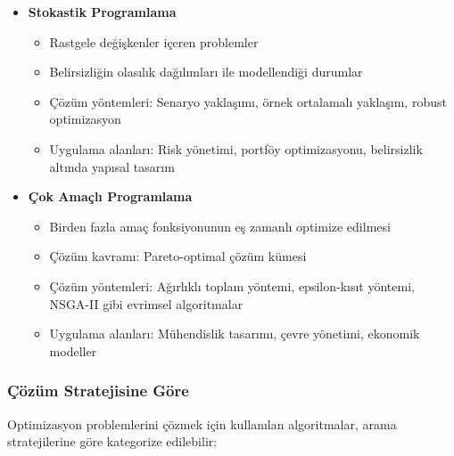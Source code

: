\begin{itemize}
    \item \textbf{Stokastik Programlama}
        \begin{itemize}
            \item Rastgele değişkenler içeren problemler
            \item Belirsizliğin olasılık dağılımları ile modellendiği durumlar
            \item Çözüm yöntemleri: Senaryo yaklaşımı, örnek ortalamalı yaklaşım, robust optimizasyon
            \item Uygulama alanları: Risk yönetimi, portföy optimizasyonu, belirsizlik altında yapısal tasarım
        \end{itemize}
        
    \item \textbf{Çok Amaçlı Programlama}
        \begin{itemize}
            \item Birden fazla amaç fonksiyonunun eş zamanlı optimize edilmesi
            \item Çözüm kavramı: Pareto-optimal çözüm kümesi
            \item Çözüm yöntemleri: Ağırlıklı toplam yöntemi, epsilon-kısıt yöntemi, NSGA-II gibi evrimsel algoritmalar
            \item Uygulama alanları: Mühendislik tasarımı, çevre yönetimi, ekonomik modeller
        \end{itemize}
\end{itemize}


\subsubsection{Çözüm Stratejisine Göre}
Optimizasyon problemlerini çözmek için kullanılan algoritmalar, arama stratejilerine göre kategorize edilebilir:

